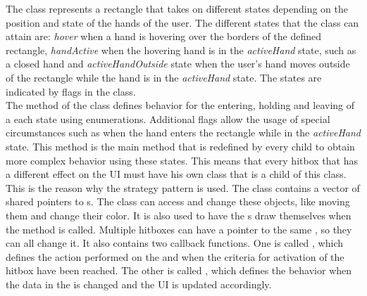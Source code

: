 The  class represents a rectangle that takes on different states depending on the position and state of the hands of the user. The different states that the class can attain are: \emph{hover} when a hand is hovering over the borders of the defined rectangle, \emph{handActive} when the hovering hand is in the \emph{activeHand} state, such as a closed hand and \emph{activeHandOutside} state when the user's hand moves outside of the rectangle while the hand is in the \emph{activeHand} state. The states are indicated by flags in the class.\\

The  method of the  class defines behavior for the entering, holding and leaving of a each state using enumerations. Additional flags allow the usage of special circumstances such as when the hand enters the rectangle while in the \emph{activeHand} state. This  method is the main method that is redefined by every child to obtain more complex behavior using these states. This means that every hitbox that has a different effect on the UI must have his own class that is a child of this class. This is the reason why the strategy pattern is used. The class contains a vector of shared pointers to s. The class can access and change these objects, like moving them and change their color. It is also used to have the s draw themselves when the method  is called. Multiple hitboxes can have a pointer to the same , so they can all change it. It also contains two callback functions. One is called , which defines the action performed on the  and  when the criteria for activation of the hitbox have been reached. The other is called , which defines the behavior when the data in the  is changed and the UI is updated accordingly.\\


